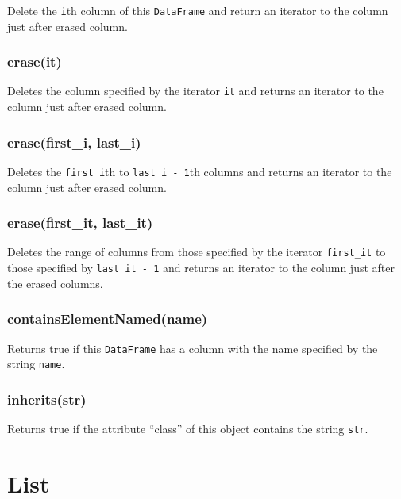 \documentclass[
]{book}
\begin{document}
Delete the \texttt{i}th column of this \texttt{DataFrame} and return an iterator to the column just after erased column.

\hypertarget{eraseit}{%
\subsection{erase(it)}\label{eraseit}}

Deletes the column specified by the iterator \texttt{it} and returns an iterator to the column just after erased column.

\hypertarget{erasefirst_i-last_i}{%
\subsection{erase(first\_i, last\_i)}\label{erasefirst_i-last_i}}

Deletes the \texttt{first\_i}th to \texttt{last\_i\ -\ 1}th columns and returns an iterator to the column just after erased column.

\hypertarget{erasefirst_it-last_it}{%
\subsection{erase(first\_it, last\_it)}\label{erasefirst_it-last_it}}

Deletes the range of columns from those specified by the iterator \texttt{first\_it} to those specified by \texttt{last\_it\ -\ 1} and returns an iterator to the column just after the erased columns.

\hypertarget{containselementnamedname}{%
\subsection{containsElementNamed(name)}\label{containselementnamedname}}

Returns true if this \texttt{DataFrame} has a column with the name specified by the string \texttt{name}.

\hypertarget{inheritsstr}{%
\subsection{inherits(str)}\label{inheritsstr}}

Returns true if the attribute ``class'' of this object contains the string \texttt{str}.

\hypertarget{list}{%
\chapter{List}\label{list}}
\end{document}
